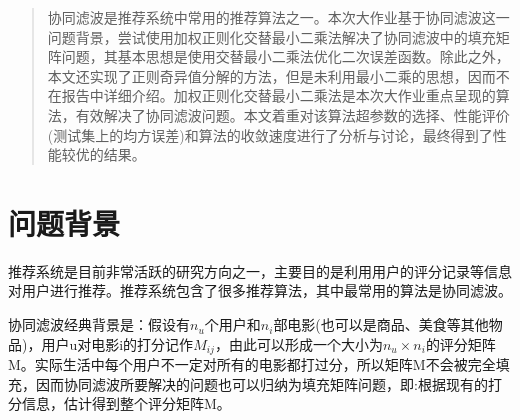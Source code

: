 \documentclass[11pt]{article}
\begin{document}
\begin{titlepage}
    \begin{center}
    \phantom{Start!}
    \vspace{3cm}
        {
        \setlength{\baselineskip}{40pt}
        \vspace{1cm}
        \vspace{3.5cm}
        \vspace{4cm}
        }
    \end{center}
\end{titlepage}


\begin{center}
\tableofcontents
\end{center}

\newpage
\twocolumn
\begin{abstract}
{\kaishu
协同滤波是推荐系统中常用的推荐算法之一。本次大作业基于协同滤波这一问题背景，尝试使用加权正则化交替最小二乘法解决了协同滤波中的填充矩阵问题，其基本思想是使用交替最小二乘法优化二次误差函数。除此之外，本文还实现了正则奇异值分解的方法，但是未利用最小二乘的思想，因而不在报告中详细介绍。加权正则化交替最小二乘法是本次大作业重点呈现的算法，有效解决了协同滤波问题。本文着重对该算法超参数的选择、性能评价(测试集上的均方误差)和算法的收敛速度进行了分析与讨论，最终得到了性能较优的结果。
}
\end{abstract}

\section{问题背景}
推荐系统是目前非常活跃的研究方向之一，主要目的是利用用户的评分记录等信息对用户进行推荐。推荐系统包含了很多推荐算法，其中最常用的算法是协同滤波。

协同滤波经典背景是：假设有$n_u$个用户和$n_i$部电影(也可以是商品、美食等其他物品)，用户u对电影i的打分记作$M_{ij}$，由此可以形成一个大小为$n_u\times n_i$的评分矩阵M。实际生活中每个用户不一定对所有的电影都打过分，所以矩阵M不会被完全填充，因而协同滤波所要解决的问题也可以归纳为填充矩阵问题，即:根据现有的打分信息，估计得到整个评分矩阵M\cite{Net}。
\end{document}

